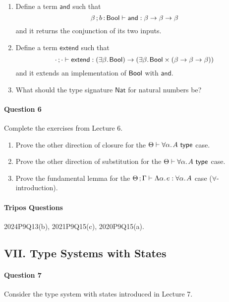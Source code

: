 \documentclass[11pt,a4paper,twoside]{article}
\begin{document}
\begin{enumerate}[label=(\alph*)]
  \item Define a term $\mathsf{and}$ such that
    \[ \beta \, ; b \,{:}\, \mathsf{Bool} \vdash \mathsf{and} : \beta \to \beta \to \beta \]
  and it returns the conjunction of its two inputs.

  \item Define a term $\mathsf{extend}$ such that
    \[ \cdot\, ; \cdot \vdash \mathsf{extend} : 
      (\exists \beta .\;\! \mathsf{Bool}) \to (\exists \beta .\;\! \mathsf{Bool} \times (\beta \to \beta \to \beta)) \]
  and it extends an implementation of $\mathsf{Bool}$ with $\mathsf{and}$.

  \item What should the type signature $\mathsf{Nat}$ for natural numbers be?
\end{enumerate}

\paragraph{Question 6} Complete the exercises from Lecture 6.

\begin{enumerate}[label=(\alph*)]
  \item Prove the other direction of closure for the $\Theta \vdash \fora{\alpha}{A}\ \mathsf{type}$ case.

  \item Prove the other direction of substitution for the $\Theta \vdash \fora{\alpha}{A}\ \mathsf{type}$ case.

  \item Prove the fundamental lemma for the $\Theta \, ; \Gamma \vdash \Lambda \alpha .\;\! e : \forall \alpha .\;\! A$ case
  ($\forall$-introduction).

\end{enumerate}

\paragraph{Tripos Questions} 2024P9Q13(b), 2021P9Q15(c), 2020P9Q15(a).

\subsection*{VII. Type Systems with States}

\paragraph{Question 7} Consider the type system with states introduced in Lecture 7.
\end{document}
